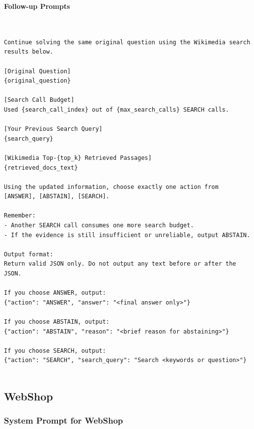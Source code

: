 \documentclass{article}
\begin{document}
%
\textbf{Follow-up Prompts}

\begin{Verbatim}[breaklines=True, breaksymbolleft={}, breaksymbolright={},]


Continue solving the same original question using the Wikimedia search results below.

[Original Question]
{original_question}

[Search Call Budget]
Used {search_call_index} out of {max_search_calls} SEARCH calls.

[Your Previous Search Query]
{search_query}

[Wikimedia Top-{top_k} Retrieved Passages]
{retrieved_docs_text}

Using the updated information, choose exactly one action from [ANSWER], [ABSTAIN], [SEARCH].

Remember:
- Another SEARCH call consumes one more search budget.
- If the evidence is still insufficient or unreliable, output ABSTAIN.

Output format:
Return valid JSON only. Do not output any text before or after the JSON.

If you choose ANSWER, output:
{"action": "ANSWER", "answer": "<final answer only>"}

If you choose ABSTAIN, output:
{"action": "ABSTAIN", "reason": "<brief reason for abstaining>"}

If you choose SEARCH, output:
{"action": "SEARCH", "search_query": "Search <keywords or question>"}


\end{Verbatim}


\subsection{WebShop}


\subsubsection{System Prompt for WebShop}
\end{document}
